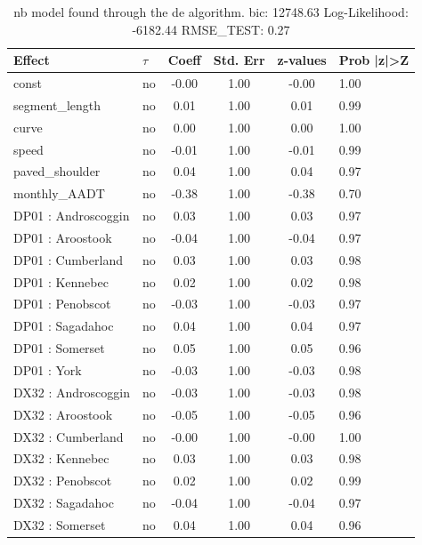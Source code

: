 \begin{table}
	\caption{nb model found through the de algorithm. bic: 12748.63 Log-Likelihood: -6182.44 RMSE_TEST: 0.27}
	\begin{center}
		\begin{tabular}{|l|l|c|c|c|l|}
			\hline
			Effect & $\tau$ & Coeff & Std. Err & z-values & Prob |z|>Z \\
			\hline
			const & no & -0.00 & 1.00 & -0.00 & 1.00 \\
			\hline
			segment_length & no & 0.01 & 1.00 & 0.01 & 0.99 \\
			\hline
			curve & no & 0.00 & 1.00 & 0.00 & 1.00 \\
			\hline
			speed & no & -0.01 & 1.00 & -0.01 & 0.99 \\
			\hline
			paved_shoulder & no & 0.04 & 1.00 & 0.04 & 0.97 \\
			\hline
			monthly_AADT & no & -0.38 & 1.00 & -0.38 & 0.70 \\
			\hline
			DP01 : Androscoggin & no & 0.03 & 1.00 & 0.03 & 0.97 \\
			\hline
			DP01 : Aroostook & no & -0.04 & 1.00 & -0.04 & 0.97 \\
			\hline
			DP01 : Cumberland & no & 0.03 & 1.00 & 0.03 & 0.98 \\
			\hline
			DP01 : Kennebec & no & 0.02 & 1.00 & 0.02 & 0.98 \\
			\hline
			DP01 : Penobscot & no & -0.03 & 1.00 & -0.03 & 0.97 \\
			\hline
			DP01 : Sagadahoc & no & 0.04 & 1.00 & 0.04 & 0.97 \\
			\hline
			DP01 : Somerset & no & 0.05 & 1.00 & 0.05 & 0.96 \\
			\hline
			DP01 : York & no & -0.03 & 1.00 & -0.03 & 0.98 \\
			\hline
			DX32 : Androscoggin & no & -0.03 & 1.00 & -0.03 & 0.98 \\
			\hline
			DX32 : Aroostook & no & -0.05 & 1.00 & -0.05 & 0.96 \\
			\hline
			DX32 : Cumberland & no & -0.00 & 1.00 & -0.00 & 1.00 \\
			\hline
			DX32 : Kennebec & no & 0.03 & 1.00 & 0.03 & 0.98 \\
			\hline
			DX32 : Penobscot & no & 0.02 & 1.00 & 0.02 & 0.99 \\
			\hline
			DX32 : Sagadahoc & no & -0.04 & 1.00 & -0.04 & 0.97 \\
			\hline
			DX32 : Somerset & no & 0.04 & 1.00 & 0.04 & 0.96 \\

\end{tabular}
\end{center}
\end{table}
